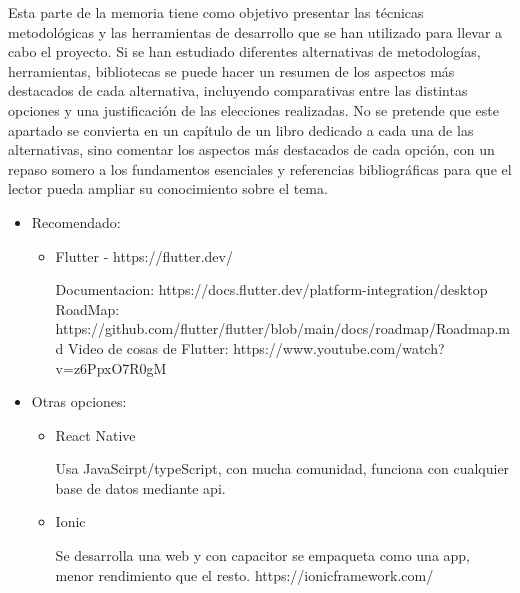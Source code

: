 
Esta parte de la memoria tiene como objetivo presentar las técnicas metodológicas y las herramientas de desarrollo que se han utilizado para llevar a cabo el proyecto. Si se han estudiado diferentes alternativas de metodologías, herramientas, bibliotecas se puede hacer un resumen de los aspectos más destacados de cada alternativa, incluyendo comparativas entre las distintas opciones y una justificación de las elecciones realizadas. 
No se pretende que este apartado se convierta en un capítulo de un libro dedicado a cada una de las alternativas, sino comentar los aspectos más destacados de cada opción, con un repaso somero a los fundamentos esenciales y referencias bibliográficas para que el lector pueda ampliar su conocimiento sobre el tema.


\begin{itemize}
	\item Recomendado:
	\begin{itemize}
		\item Flutter - https://flutter.dev/
		
		Documentacion: https://docs.flutter.dev/platform-integration/desktop
		RoadMap: https://github.com/flutter/flutter/blob/main/docs/roadmap/Roadmap.md
		Video de cosas de Flutter: https://www.youtube.com/watch?v=z6PpxO7R0gM
	\end{itemize}
	\item Otras opciones:
	\begin{itemize}
		\item React Native
		
		Usa JavaScirpt/typeScript, con mucha comunidad, funciona con cualquier base de datos mediante api.
		
		\item Ionic
		
		Se desarrolla una web y con capacitor se empaqueta como una app, menor rendimiento que el resto.
		https://ionicframework.com/
	\end{itemize}
\end{itemize}